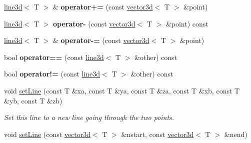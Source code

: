 \begin{DoxyCompactItemize}
\item 
\hyperlink{classirr_1_1core_1_1line3d}{line3d}$<$ T $>$ \& {\bfseries operator+=} (const \hyperlink{classirr_1_1core_1_1vector3d}{vector3d}$<$ T $>$ \&point)\hypertarget{classirr_1_1core_1_1line3d_a087964aee6bc9250364a2419c4fd8bcd}{}\label{classirr_1_1core_1_1line3d_a087964aee6bc9250364a2419c4fd8bcd}

\item 
\hyperlink{classirr_1_1core_1_1line3d}{line3d}$<$ T $>$ {\bfseries operator-\/} (const \hyperlink{classirr_1_1core_1_1vector3d}{vector3d}$<$ T $>$ \&point) const \hypertarget{classirr_1_1core_1_1line3d_a3b068104309f8eb6ed8ae3f8ad9c0536}{}\label{classirr_1_1core_1_1line3d_a3b068104309f8eb6ed8ae3f8ad9c0536}

\item 
\hyperlink{classirr_1_1core_1_1line3d}{line3d}$<$ T $>$ \& {\bfseries operator-\/=} (const \hyperlink{classirr_1_1core_1_1vector3d}{vector3d}$<$ T $>$ \&point)\hypertarget{classirr_1_1core_1_1line3d_aef9ba9ecbfac940e2d221f67015774ce}{}\label{classirr_1_1core_1_1line3d_aef9ba9ecbfac940e2d221f67015774ce}

\item 
bool {\bfseries operator==} (const \hyperlink{classirr_1_1core_1_1line3d}{line3d}$<$ T $>$ \&other) const \hypertarget{classirr_1_1core_1_1line3d_a4d0d98986e6bffdf0bb943e103707c65}{}\label{classirr_1_1core_1_1line3d_a4d0d98986e6bffdf0bb943e103707c65}

\item 
bool {\bfseries operator!=} (const \hyperlink{classirr_1_1core_1_1line3d}{line3d}$<$ T $>$ \&other) const \hypertarget{classirr_1_1core_1_1line3d_ad73e0c54bfaded49c81b618c6caf3284}{}\label{classirr_1_1core_1_1line3d_ad73e0c54bfaded49c81b618c6caf3284}

\item 
void \hyperlink{classirr_1_1core_1_1line3d_aa691426799bff0ccf37bc09f56b8fa59}{set\+Line} (const T \&xa, const T \&ya, const T \&za, const T \&xb, const T \&yb, const T \&zb)\hypertarget{classirr_1_1core_1_1line3d_aa691426799bff0ccf37bc09f56b8fa59}{}\label{classirr_1_1core_1_1line3d_aa691426799bff0ccf37bc09f56b8fa59}

\begin{DoxyCompactList}\small\item\em Set this line to a new line going through the two points. \end{DoxyCompactList}\item 
void \hyperlink{classirr_1_1core_1_1line3d_af66862d06acc114567e1e0cfaa23f429}{set\+Line} (const \hyperlink{classirr_1_1core_1_1vector3d}{vector3d}$<$ T $>$ \&nstart, const \hyperlink{classirr_1_1core_1_1vector3d}{vector3d}$<$ T $>$ \&nend)\hypertarget{classirr_1_1core_1_1line3d_af66862d06acc114567e1e0cfaa23f429}{}\label{classirr_1_1core_1_1line3d_af66862d06acc114567e1e0cfaa23f429}


\end{DoxyCompactItemize}
